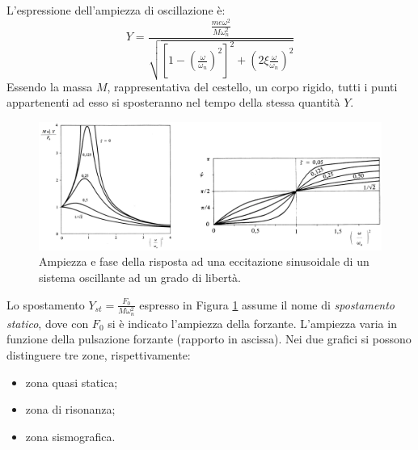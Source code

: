 L'espressione dell'ampiezza di oscillazione è:
\begin{equation}
    Y=\frac{\frac{me\omega^2}{M\omega_n^2}}{\sqrt{{[1-(\frac{\omega}{\omega_n})^2]^2}+(2\xi \frac{\omega}{\omega_n})^2}}
    \label{Ampiezza}
\end{equation}
Essendo la massa $M$, rappresentativa del cestello, un corpo rigido, tutti i punti appartenenti ad esso si sposteranno nel tempo della stessa quantità $Y$. 
\begin{figure}[h]
    \centering
    \includegraphics[width=\textwidth]{AmpiezzaEFase.png}
    \caption{Ampiezza e fase della risposta ad una eccitazione sinusoidale di un sistema oscillante ad un grado di libertà.}
    \label{AmpiezzaEfase}
\end{figure}

Lo spostamento $Y_{st}=\frac{F_0}{M\omega_n^2}$ espresso in Figura \ref{AmpiezzaEfase} assume il nome di \textit{spostamento statico}, dove con $F_0$ si è indicato l'ampiezza della forzante. L'ampiezza varia in funzione della pulsazione forzante (rapporto in ascissa). Nei due grafici si possono distinguere tre zone, rispettivamente:
\begin{itemize}
    \item zona quasi statica;
    \item zona di risonanza;
    \item zona sismografica.
\end{itemize}

